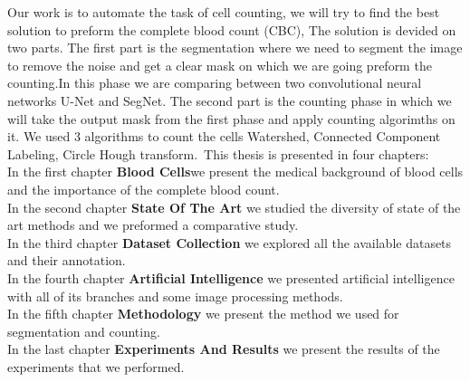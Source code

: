 Our work is to automate the task of cell counting, we will  try to find the best solution to preform the complete blood count (CBC), The solution is devided on two parts.
The first part is the segmentation where we need to segment the image to remove the noise and get a clear mask on which we are going preform the counting.In this phase we are comparing between two convolutional neural networks U-Net and SegNet.
The second part is the counting phase in which we will take  the output mask from the first phase and apply counting algorimths on it. We used 3 algorithms to count the cells Watershed, Connected Component Labeling, Circle Hough transform.\
This thesis is presented in four chapters:\\
In the first chapter \textbf{Blood Cells}we present the medical background of blood cells and the importance of the complete blood count.\\
In the second chapter \textbf{State Of The Art} we studied the diversity of state of the art methods and we preformed a comparative study.\\
In the third chapter \textbf{Dataset Collection} we explored all the available datasets and their annotation.\\
In the fourth chapter \textbf{Artificial Intelligence} we presented artificial intelligence with all of its branches and some image processing methods.\\
In the fifth chapter \textbf{Methodology} we present the method we used for segmentation and counting.\\
In the last chapter \textbf{Experiments And Results} we present the results of the experiments that we performed.

